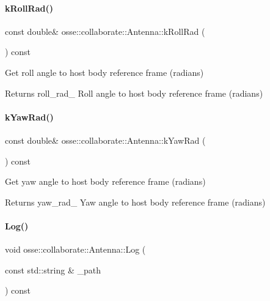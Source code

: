 \paragraph{\texorpdfstring{k\+Roll\+Rad()}{kRollRad()}}
{\footnotesize\ttfamily const double\& osse\+::collaborate\+::\+Antenna\+::k\+Roll\+Rad (\begin{DoxyParamCaption}{ }\end{DoxyParamCaption}) const\hspace{0.3cm}{\ttfamily [inline]}}



Get roll angle to host body reference frame (radians) 

\begin{DoxyReturn}{Returns}
roll\+\_\+rad\+\_\+ Roll angle to host body reference frame (radians) 
\end{DoxyReturn}
\mbox{\label{classosse_1_1collaborate_1_1_antenna_a79acbd84d9ad9a739ec0a8c60b49bc93}} 
\paragraph{\texorpdfstring{k\+Yaw\+Rad()}{kYawRad()}}
{\footnotesize\ttfamily const double\& osse\+::collaborate\+::\+Antenna\+::k\+Yaw\+Rad (\begin{DoxyParamCaption}{ }\end{DoxyParamCaption}) const\hspace{0.3cm}{\ttfamily [inline]}}



Get yaw angle to host body reference frame (radians) 

\begin{DoxyReturn}{Returns}
yaw\+\_\+rad\+\_\+ Yaw angle to host body reference frame (radians) 
\end{DoxyReturn}
\mbox{\label{classosse_1_1collaborate_1_1_antenna_ae24d52fa84fd3acff597c56259f4aba6}} 
\paragraph{\texorpdfstring{Log()}{Log()}}
{\footnotesize\ttfamily void osse\+::collaborate\+::\+Antenna\+::\+Log (\begin{DoxyParamCaption}\item[{const std\+::string \&}]{\+\_\+path }\end{DoxyParamCaption}) const}



